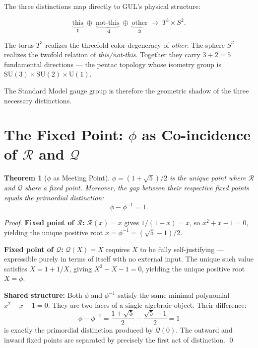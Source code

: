 \documentclass[11pt]{article}
\newtheorem{theorem}{Theorem}
\begin{document}
The three distinctions map directly to GUL's physical structure:

\begin{equation}
  \underbrace{\text{this}}_{\mathbf{1}}
  \;\oplus\;
  \underbrace{\text{not-this}}_{\neg\mathbf{1}}
  \;\oplus\;
  \underbrace{\text{other}}_{\mathbf{3}}
  \;\longrightarrow\;
  T^3 \times S^2.
\end{equation}

The torus $T^3$ realizes the threefold color degeneracy of
\emph{other}. The sphere $S^2$ realizes the twofold relation of
\emph{this/not-this}. Together they carry $3+2=5$ fundamental
directions --- the pentac topology whose isometry group is
$\mathrm{SU}(3)\times\mathrm{SU}(2)\times\mathrm{U}(1)$.

The Standard Model gauge group is therefore the geometric shadow
of the three necessary distinctions.

\section{The Fixed Point: $\phi$ as Co-incidence of $\mathcal{R}$
and $\mathcal{Q}$}
\label{sec:fixedpoint}

\begin{theorem}[$\phi$ as Meeting Point]
  $\phi=(1+\sqrt{5})/2$ is the unique point where $\mathcal{R}$
  and $\mathcal{Q}$ share a fixed point. Moreover, the gap between
  their respective fixed points equals the primordial distinction:
  \begin{equation}
    \phi - \phi^{-1} = 1.
  \end{equation}
\end{theorem}

\begin{proof}
  \textbf{Fixed point of $\mathcal{R}$:}
  $\mathcal{R}(x)=x$ gives $1/(1+x)=x$, so $x^2+x-1=0$,
  yielding the unique positive root $x=\phi^{-1}=(\sqrt{5}-1)/2$.

  \textbf{Fixed point of $\mathcal{Q}$:}
  $\mathcal{Q}(X)=X$ requires $X$ to be fully self-justifying ---
  expressible purely in terms of itself with no external input.
  The unique such value satisfies $X=1+1/X$, giving
  $X^2-X-1=0$, yielding the unique positive root $X=\phi$.

  \textbf{Shared structure:}
  Both $\phi$ and $\phi^{-1}$ satisfy the same minimal polynomial
  $x^2-x-1=0$. They are two faces of a single algebraic object.
  Their difference:
  \begin{equation}
    \phi - \phi^{-1}
    = \frac{1+\sqrt{5}}{2} - \frac{\sqrt{5}-1}{2} = 1
  \end{equation}
  is exactly the primordial distinction produced by
  $\mathcal{Q}(0)$. The outward and inward fixed points are
  separated by precisely the first act of distinction. \qed
\end{proof}
\end{document}

